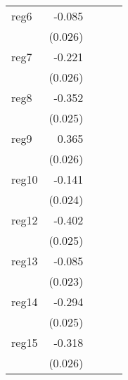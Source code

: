 {\begin{longtable}{l*{4}{D{.}{.}{-1}}}
\addlinespace
reg6        &      -0.085\sym{**} &                     &                     &                     \\
            &     (0.026)         &                     &                     &                     \\
\addlinespace
reg7        &      -0.221\sym{***}&                     &                     &                     \\
            &     (0.026)         &                     &                     &                     \\
\addlinespace
reg8        &      -0.352\sym{***}&                     &                     &                     \\
            &     (0.025)         &                     &                     &                     \\
\addlinespace
reg9        &       0.365\sym{***}&                     &                     &                     \\
            &     (0.026)         &                     &                     &                     \\
\addlinespace
reg10       &      -0.141\sym{***}&                     &                     &                     \\
            &     (0.024)         &                     &                     &                     \\
\addlinespace
reg12       &      -0.402\sym{***}&                     &                     &                     \\
            &     (0.025)         &                     &                     &                     \\
\addlinespace
reg13       &      -0.085\sym{***}&                     &                     &                     \\
            &     (0.023)         &                     &                     &                     \\
\addlinespace
reg14       &      -0.294\sym{***}&                     &                     &                     \\
            &     (0.025)         &                     &                     &                     \\
\addlinespace
reg15       &      -0.318\sym{***}&                     &                     &                     \\
            &     (0.026)         &                     &                     &                     \\

\end{longtable}}
